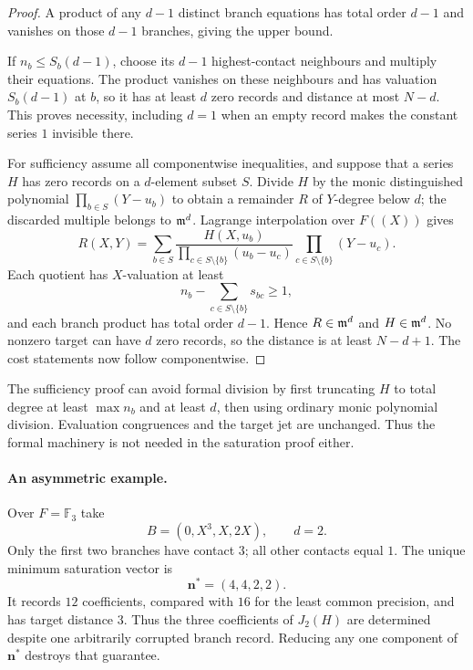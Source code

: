 \begin{proof}
A product of any $d-1$ distinct branch equations has total order $d-1$ and
vanishes on those $d-1$ branches, giving the upper bound.

If $n_b\le S_b(d-1)$, choose its $d-1$ highest-contact neighbours and multiply
their equations. The product vanishes on these neighbours and has valuation
$S_b(d-1)$ at $b$, so it has at least $d$ zero records and distance at most
$N-d$. This proves necessity, including $d=1$ when an empty record makes the
constant series $1$ invisible there.

For sufficiency assume all componentwise inequalities, and suppose that a
series $H$ has zero records on a $d$-element subset $S$. Divide $H$ by the
monic distinguished polynomial $\prod_{b\in S}(Y-u_b)$ to obtain a
remainder $R$ of $Y$-degree below $d$; the discarded multiple belongs to
$\mathfrak m^d$. Lagrange interpolation over $F((X))$ gives
\[
 R(X,Y)=\sum_{b\in S}
 \frac{H(X,u_b)}{\prod_{c\in S\setminus\{b\}}(u_b-u_c)}
 \prod_{c\in S\setminus\{b\}}(Y-u_c).
\]
Each quotient has $X$-valuation at least
\[
 n_b-\sum_{c\in S\setminus\{b\}}s_{bc}\ge1,
\]
and each branch product has total order $d-1$. Hence $R\in\mathfrak m^d$ and
$H\in\mathfrak m^d$. No nonzero target can have $d$ zero records, so the distance
is at least $N-d+1$. The cost statements now follow componentwise.
\end{proof}

\begin{remark}
The sufficiency proof can avoid formal division by first truncating $H$ to
total degree at least $\max n_b$ and at least $d$, then using ordinary monic
polynomial division. Evaluation congruences and the target jet are
unchanged. Thus the formal machinery is not needed in the saturation proof
either.
\end{remark}

\paragraph{An asymmetric example.}
Over $F=\mathbb F_3$ take
\[
 B=(0,X^3,X,2X),\qquad d=2.
\]
Only the first two branches have contact $3$; all other contacts equal $1$.
The unique minimum saturation vector is
\[
 \mathbf n^*=(4,4,2,2).
\]
It records $12$ coefficients, compared with $16$ for the least common
precision, and has target distance $3$. Thus the three coefficients of
$J_2(H)$ are determined despite one arbitrarily corrupted branch record.
Reducing any one component of $\mathbf n^*$ destroys that guarantee.

